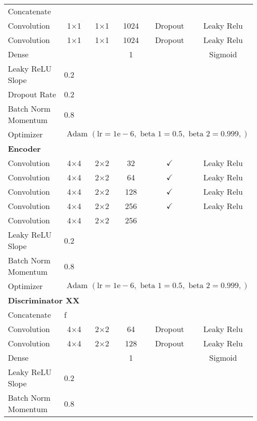 \begin{longtable}[c]{@{}lccccc@{}}
	Concatenate &\multicolumn{5}{l}{} \\
	Convolution & \multicolumn{1}{c}{1$\times$1} & 1$\times$1 & 1024 & Dropout & Leaky Relu \\
	Convolution & \multicolumn{1}{c}{1$\times$1} & 1$\times$1 & 1024 & Dropout & Leaky Relu \\
	Dense & \multicolumn{1}{c}{} &  & 1 &  & Sigmoid \\ \hline
	Leaky ReLU Slope & \multicolumn{5}{l}{0.2} \\
	Dropout Rate & \multicolumn{5}{l}{0.2} \\
	Batch Norm Momentum & \multicolumn{5}{l}{0.8} \\
	Optimizer & \multicolumn{5}{l}{$\text { Adam }(\mathrm{lr}=1 \mathrm{e}-6, \text { beta } 1=0.5, \text { beta } 2=0.999,)$} \\ \hline
	\multicolumn{6}{l}{\textbf{Encoder}} \\
	Convolution & \multicolumn{1}{c}{4$\times$4} & 2$\times$2 & 32 & $\checkmark$ & Leaky Relu \\
	Convolution & \multicolumn{1}{c}{4$\times$4} & 2$\times$2 & 64 & $\checkmark$ & Leaky Relu \\
	Convolution & \multicolumn{1}{c}{4$\times$4} & 2$\times$2 & 128 & $\checkmark$ & Leaky Relu \\
	Convolution & \multicolumn{1}{c}{4$\times$4} & 2$\times$2 & 256 & $\checkmark$ & Leaky Relu \\
	Convolution & \multicolumn{1}{c}{4$\times$4} & 2$\times$2 & 256 &  &  \\ \hline
	Leaky ReLU Slope & \multicolumn{5}{l}{0.2} \\
	Batch Norm Momentum & \multicolumn{5}{l}{0.8} \\
	Optimizer & \multicolumn{5}{l}{$\text { Adam }(\mathrm{lr}=1 \mathrm{e}-6, \text { beta } 1=0.5, \text { beta } 2=0.999,)$} \\ \hline
	\multicolumn{6}{l}{\textbf{Discriminator XX}} \\
	Concatenate &\multicolumn{5}{l}{f} \\
	Convolution & \multicolumn{1}{c}{4$\times$4} & 2$\times$2 & 64 & Dropout & Leaky Relu \\
	Convolution & \multicolumn{1}{c}{4$\times$4} & 2$\times$2 & 128 & Dropout & Leaky Relu \\
	Dense & \multicolumn{1}{c}{} &  & 1 &  & Sigmoid \\ \hline
	Leaky ReLU Slope & \multicolumn{5}{l}{0.2} \\
	Batch Norm Momentum & \multicolumn{5}{l}{0.8} \\

\end{longtable}
